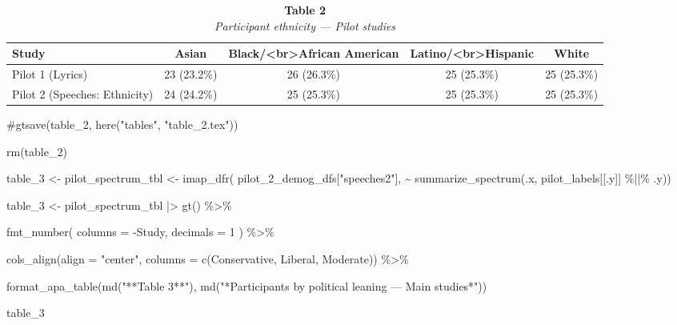 \documentclass[
  man]{apa7}
\newenvironment{Shaded}{\begin{snugshade}}{\end{snugshade}}
\newcommand{\AttributeTok}[1]{\textcolor[rgb]{0.40,0.45,0.13}{#1}}
\newcommand{\CommentTok}[1]{\textcolor[rgb]{0.37,0.37,0.37}{#1}}
\newcommand{\DecValTok}[1]{\textcolor[rgb]{0.68,0.00,0.00}{#1}}
\newcommand{\FunctionTok}[1]{\textcolor[rgb]{0.28,0.35,0.67}{#1}}
\newcommand{\NormalTok}[1]{\textcolor[rgb]{0.00,0.23,0.31}{#1}}
\newcommand{\OtherTok}[1]{\textcolor[rgb]{0.00,0.23,0.31}{#1}}
\newcommand{\SpecialCharTok}[1]{\textcolor[rgb]{0.37,0.37,0.37}{#1}}
\newcommand{\StringTok}[1]{\textcolor[rgb]{0.13,0.47,0.30}{#1}}
\begin{document}
\begin{table}
\caption*{
{\large \textbf{Table 2}} \\ 
{\small \emph{Participant ethnicity --- Pilot studies}}
} 
\fontsize{9.0pt}{10.8pt}\selectfont
\begin{tabular*}{\linewidth}{@{\extracolsep{\fill}}lcccc}
\toprule
Study & Asian & Black/<br>African American & Latino/<br>Hispanic & White \\ 
\midrule\addlinespace[2.5pt]
Pilot 1 (Lyrics) & 23 (23.2\%) & 26 (26.3\%) & 25 (25.3\%) & 25 (25.3\%) \\ 
Pilot 2 (Speeches: Ethnicity) & 24 (24.2\%) & 25 (25.3\%) & 25 (25.3\%) & 25 (25.3\%) \\ 
\bottomrule
\end{tabular*}
\end{table}

\begin{Shaded}
\begin{Highlighting}[]
\CommentTok{\#gtsave(table\_2, here("tables", "table\_2.tex"))}

\FunctionTok{rm}\NormalTok{(table\_2)}
\end{Highlighting}
\end{Shaded}

\begin{Shaded}
\begin{Highlighting}[]
\NormalTok{table\_3 }\OtherTok{\textless{}{-}}\NormalTok{ pilot\_spectrum\_tbl }\OtherTok{\textless{}{-}} \FunctionTok{imap\_dfr}\NormalTok{(}
\NormalTok{  pilot\_2\_demog\_dfs[}\StringTok{"speeches2"}\NormalTok{],}
  \SpecialCharTok{\textasciitilde{}} \FunctionTok{summarize\_spectrum}\NormalTok{(.x, pilot\_labels[[.y]] }\SpecialCharTok{\%||\%}\NormalTok{ .y))}

\NormalTok{table\_3 }\OtherTok{\textless{}{-}}\NormalTok{ pilot\_spectrum\_tbl }\SpecialCharTok{|\textgreater{}}
  \FunctionTok{gt}\NormalTok{() }\SpecialCharTok{\%\textgreater{}\%}
  
  \FunctionTok{fmt\_number}\NormalTok{(}
    \AttributeTok{columns =} \SpecialCharTok{{-}}\NormalTok{Study, }
    \AttributeTok{decimals =} \DecValTok{1}
\NormalTok{  ) }\SpecialCharTok{\%\textgreater{}\%}
  
  \FunctionTok{cols\_align}\NormalTok{(}\AttributeTok{align =} \StringTok{"center"}\NormalTok{, }\AttributeTok{columns =} \FunctionTok{c}\NormalTok{(Conservative, Liberal, Moderate)) }\SpecialCharTok{\%\textgreater{}\%}
  
  \FunctionTok{format\_apa\_table}\NormalTok{(}\FunctionTok{md}\NormalTok{(}\StringTok{"**Table 3**"}\NormalTok{), }\FunctionTok{md}\NormalTok{(}\StringTok{"*Participants by political leaning — Main studies*"}\NormalTok{))}

\NormalTok{table\_3}
\end{Highlighting}
\end{Shaded}
\end{document}
